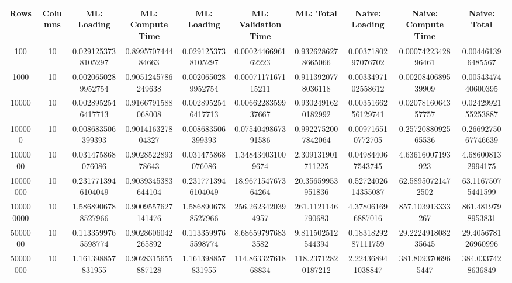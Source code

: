 \begin{table}[htb]
    \centering
    \begin{tabular}{@{}cccccccccc@{}}
        \toprule
        Rows & Columns & ML: Loading & ML: Compute Time & ML: Loading & ML: Validation Time & ML: Total & Naive: Loading & Naive: Compute Time & Naive: Total \\
        \midrule
        100 & 10 & 0.0291253738105297 & 0.899570744484663 & 0.0291253738105297 & 0.0002446696162223 & 0.9326286278665066 & 0.0037180297076702 & 0.0007422342896461 & 0.004461396485567 \\
        1000 & 10 & 0.0020650289952754 & 0.9051245786249638 & 0.0020650289952754 & 0.0007117167115211 & 0.9113920778036118 & 0.0033497102558612 & 0.0020840689539909 & 0.0054347440600395 \\
        10000 & 10 & 0.0028952546417713 & 0.9166791588068008 & 0.0028952546417713 & 0.0066228359937667 & 0.9302491620182992 & 0.0035166256129741 & 0.0207816064357757 & 0.0242992155253887 \\
        100000 & 10 & 0.008683506399393 & 0.901416327804327 & 0.008683506399393 & 0.0754049867391586 & 0.9922752007842064 & 0.009716510772705 & 0.2572088092565536 & 0.2669275067746639 \\
        1000000 & 10 & 0.031475868076086 & 0.902852289378643 & 0.031475868076086 & 1.348434031009674 & 2.309131901711225 & 0.049844067543745 & 4.63616007193923 & 4.686008132994175 \\
        10000000 & 10 & 0.2317713946104049 & 0.9039345383644104 & 0.2317713946104049 & 18.967154767364264 & 20.35659953951836 & 0.5272402614355087 & 62.58950721472502 & 63.11675075441599 \\
        100000000 & 10 & 1.5868906788527966 & 0.9009557627141476 & 1.5868906788527966 & 256.2623420394957 & 261.1121146790683 & 4.378061696887016 & 857.103913333267 & 861.4819798953831 \\
        5000000 & 10 & 0.1133599765598774 & 0.9028606042265892 & 0.1133599765598774 & 8.686597976833582 & 9.811502512544394 & 0.1831829287111759 & 29.222491808235645 & 29.405678126960996 \\
        50000000 & 10 & 1.161398857831955 & 0.9028315655887128 & 1.161398857831955 & 114.86332761868834 & 118.23712820187212 & 2.224368941038847 & 381.8093706965447 & 384.0337428636849 \\
        \bottomrule
    \end{tabular}
\end{table}